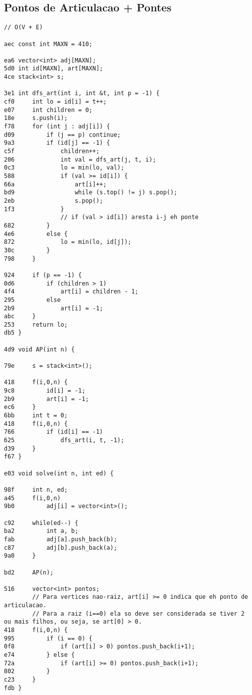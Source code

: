 \documentclass[11pt, a4paper, twoside]{article}
\begin{document}
\subsection{Pontos de Articulacao + Pontes}
\begin{lstlisting}
// O(V + E)

aec const int MAXN = 410;

ea6 vector<int> adj[MAXN];
5d0 int id[MAXN], art[MAXN];
4ce stack<int> s;

3e1 int dfs_art(int i, int &t, int p = -1) {
cf0     int lo = id[i] = t++;
e07     int children = 0;
18e     s.push(i);
f78     for (int j : adj[i]) {
d09         if (j == p) continue;
9a3         if (id[j] == -1) {
c5f             children++;
206             int val = dfs_art(j, t, i);
0c3             lo = min(lo, val);
588             if (val >= id[i]) {
66a                 art[i]++;
bd9                 while (s.top() != j) s.pop();
2eb                 s.pop();
1f3             }
    			// if (val > id[i]) aresta i-j eh ponte
682         }
4e6         else {
872             lo = min(lo, id[j]);
30c         }
798     }
        
924 	if (p == -1) {
0d6         if (children > 1)
4f4             art[i] = children - 1;
295         else
2b9             art[i] = -1;
abc     }
253     return lo;
db5 }

4d9 void AP(int n) {
    
79e 	s = stack<int>();
        
418 	f(i,0,n) { 
9c8         id[i] = -1; 
2b9         art[i] = -1; 
ec6     }
6bb     int t = 0;
418     f(i,0,n) {
766         if (id[i] == -1)
625             dfs_art(i, t, -1);
d39     }
f67 }

e03 void solve(int n, int ed) {
    
98f 	int n, ed;
a45 	f(i,0,n)
9b0         adj[i] = vector<int>();
    
c92     while(ed--) {
ba2         int a, b; 
fab         adj[a].push_back(b);
c87         adj[b].push_back(a);
9a0     }
    
bd2     AP(n);
        
516     vector<int> pontos;
        // Para vertices nao-raiz, art[i] >= 0 indica que eh ponto de articulacao.
        // Para a raiz (i==0) ela so deve ser considerada se tiver 2 ou mais filhos, ou seja, se art[0] > 0.
418     f(i,0,n) {
995         if (i == 0) {
0f8             if (art[i] > 0) pontos.push_back(i+1);
e74         } else {
72a             if (art[i] >= 0) pontos.push_back(i+1);
802         }
c23     }
fdb }

\end{lstlisting}
\end{document}
